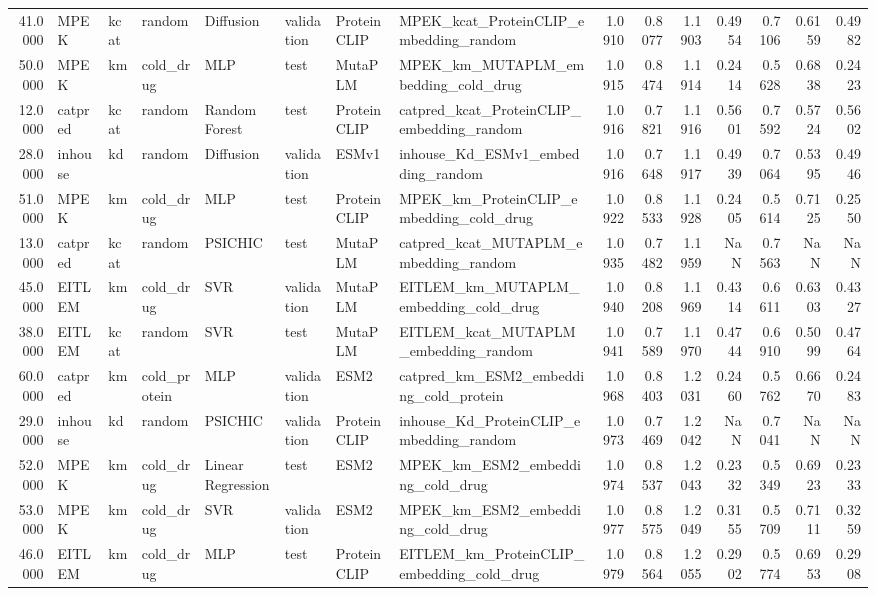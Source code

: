 \begin{tabular}{rlllllllrrrrrrr}
41.0000 & MPEK & kcat & random & Diffusion & validation & ProteinCLIP & MPEK_kcat_ProteinCLIP_embedding_random & 1.0910 & 0.8077 & 1.1903 & 0.4954 & 0.7106 & 0.6159 & 0.4982 \\
50.0000 & MPEK & km & cold_drug & MLP & test & MutaPLM & MPEK_km_MUTAPLM_embedding_cold_drug & 1.0915 & 0.8474 & 1.1914 & 0.2414 & 0.5628 & 0.6838 & 0.2423 \\
12.0000 & catpred & kcat & random & Random Forest & test & ProteinCLIP & catpred_kcat_ProteinCLIP_embedding_random & 1.0916 & 0.7821 & 1.1916 & 0.5601 & 0.7592 & 0.5724 & 0.5602 \\
28.0000 & inhouse & kd & random & Diffusion & validation & ESMv1 & inhouse_Kd_ESMv1_embedding_random & 1.0916 & 0.7648 & 1.1917 & 0.4939 & 0.7064 & 0.5395 & 0.4946 \\
51.0000 & MPEK & km & cold_drug & MLP & test & ProteinCLIP & MPEK_km_ProteinCLIP_embedding_cold_drug & 1.0922 & 0.8533 & 1.1928 & 0.2405 & 0.5614 & 0.7125 & 0.2550 \\
13.0000 & catpred & kcat & random & PSICHIC & test & MutaPLM & catpred_kcat_MUTAPLM_embedding_random & 1.0935 & 0.7482 & 1.1959 & NaN & 0.7563 & NaN & NaN \\
45.0000 & EITLEM & km & cold_drug & SVR & validation & MutaPLM & EITLEM_km_MUTAPLM_embedding_cold_drug & 1.0940 & 0.8208 & 1.1969 & 0.4314 & 0.6611 & 0.6303 & 0.4327 \\
38.0000 & EITLEM & kcat & random & SVR & test & MutaPLM & EITLEM_kcat_MUTAPLM_embedding_random & 1.0941 & 0.7589 & 1.1970 & 0.4744 & 0.6910 & 0.5099 & 0.4764 \\
60.0000 & catpred & km & cold_protein & MLP & validation & ESM2 & catpred_km_ESM2_embedding_cold_protein & 1.0968 & 0.8403 & 1.2031 & 0.2460 & 0.5762 & 0.6670 & 0.2483 \\
29.0000 & inhouse & kd & random & PSICHIC & validation & ProteinCLIP & inhouse_Kd_ProteinCLIP_embedding_random & 1.0973 & 0.7469 & 1.2042 & NaN & 0.7041 & NaN & NaN \\
52.0000 & MPEK & km & cold_drug & Linear Regression & test & ESM2 & MPEK_km_ESM2_embedding_cold_drug & 1.0974 & 0.8537 & 1.2043 & 0.2332 & 0.5349 & 0.6923 & 0.2333 \\
53.0000 & MPEK & km & cold_drug & SVR & validation & ESM2 & MPEK_km_ESM2_embedding_cold_drug & 1.0977 & 0.8575 & 1.2049 & 0.3155 & 0.5709 & 0.7111 & 0.3259 \\
46.0000 & EITLEM & km & cold_drug & MLP & test & ProteinCLIP & EITLEM_km_ProteinCLIP_embedding_cold_drug & 1.0979 & 0.8564 & 1.2055 & 0.2902 & 0.5774 & 0.6953 & 0.2908 \\

\end{tabular}
